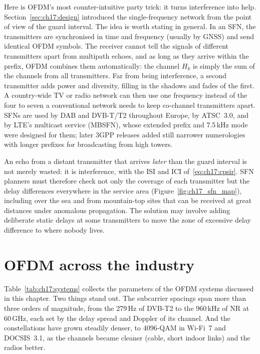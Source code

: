 Here is OFDM's most counter-intuitive party trick: it turns interference into help.
Section~\ref{sec:ch17:design} introduced the single-frequency network from the point of view of the guard
interval. The idea is worth stating in general. In an SFN, the transmitters are synchronised in time and frequency
(usually by GNSS) and send identical OFDM symbols. The receiver cannot tell the signals of different transmitters
apart from multipath echoes, and as long as they arrive within the prefix, OFDM combines them automatically:
the channel $H_k$ is simply the sum of the channels from all transmitters. Far from being interference, a second
transmitter adds power and diversity, filling in the shadows and fades of the first. A country-wide TV or radio
network can then use one frequency instead of the four to seven a conventional network needs to keep
co-channel transmitters apart. SFNs are used by DAB and DVB-T/T2 throughout Europe, by ATSC~3.0, and by LTE's
multicast service (MBSFN), whose extended prefix and 7.5\,kHz mode were designed for them; later 3GPP releases
added still narrower numerologies with longer prefixes for broadcasting from high towers.

\begin{pitfall}
An echo from a distant transmitter that arrives \emph{later} than the guard interval is not merely wasted: it
is interference, with the ISI and ICI of~\eqref{eq:ch17:cpsir}. SFN planners must therefore check not only
the coverage of each transmitter but the delay differences everywhere in the service area
(Figure~\ref{fig:ch17_sfn_map}), including over the sea and from mountain-top sites that can be received at
great distances under anomalous propagation. The solution may involve adding deliberate static delays at some
transmitters to move the zone of excessive delay difference to where nobody lives.
\end{pitfall}

\section{OFDM across the industry}
\label{sec:ch17:systems}

Table~\ref{tab:ch17:systems} collects the parameters of the OFDM systems discussed in this chapter. Two things
stand out. The subcarrier spacings span more than three orders of magnitude, from the 279\,Hz of DVB-T2 to the
960\,kHz of NR at 60\,GHz, each set by the delay spread and Doppler of its channel. And the constellations have
grown steadily denser, to 4096-QAM in Wi-Fi~7 and DOCSIS~3.1, as the channels became cleaner (cable, short
indoor links) and the radios better.

